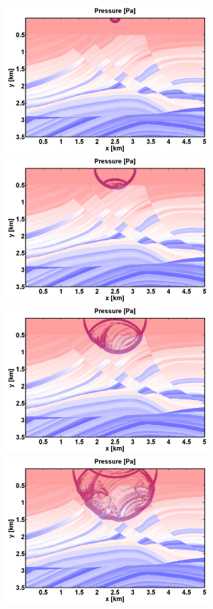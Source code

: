 \begin{figure}
\begin{center}
\includegraphics[width=7.5cm]{figures/marmousi/shot93_snap_2.pdf}\includegraphics[width=7.5cm]{figures/marmousi/shot93_snap_5.pdf}\\ 
\includegraphics[width=7.5cm]{figures/marmousi/shot93_snap_7.pdf}\includegraphics[width=7.5cm]{figures/marmousi/shot93_snap_9.pdf}\\ 

\end{center}
\end{figure}
